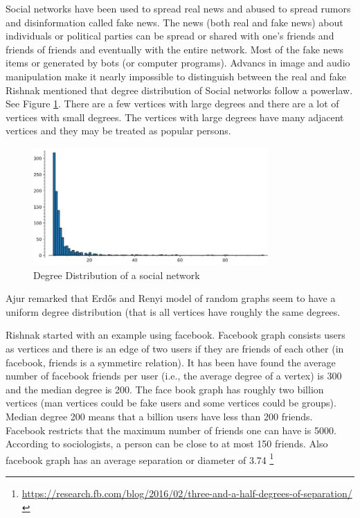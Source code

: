  Social networks have been used to spread real news and abused to spread rumors and disinformation called fake news. The news (both real and fake news) about individuals or political parties can be spread or shared with
 one's friends and friends of friends and eventually with the entire network. Most of the fake news items or  generated by bots (or computer programs). Advancs in image and audio manipulation make it nearly impossible to distinguish between the real and fake 
 Rishnak mentioned that degree distribution of Social networks follow a powerlaw. See Figure \ref{21p1}.  There are a few vertices with large degrees and there are a lot of vertices with small degrees.  The vertices with large degrees have many adjacent vertices and they may be treated as popular persons.
 \begin{figure}
 \begin{center}
\includegraphics[width=0.8\textwidth]{degreepowerlawdist.jpg}
\caption{Degree Distribution of a social network}\label{21p1}
\end{center}

\end{figure}
\begin{newpage}
\end{newpage}
 
 Ajur remarked that Erd\H{o}s and Renyi model of random graphs seem to have a uniform degree distribution (that is all vertices have roughly the same degrees.
 
 Rishnak started with an example using facebook. Facebook graph consists users as vertices and there is an edge of two users if they are friends of each other (in facebook, friends is a symmetirc relation). It has been
 have found the average number of facebook friends per user (i.e., the average degree of a vertex) is 300 and the median degree is 200. The face book graph has roughly two billion vertices (man vertices could be fake users and some vertices could be groups). Median degree 200 means that a billion users have less than 200 friends. Facebook restricts that the maximum number of friends one can have is 5000. According to sociologists, a person can be close to at most 150 friends. Also facebook graph has an average separation or diameter of 3.74 \footnote{\url{https://research.fb.com/blog/2016/02/three-and-a-half-degrees-of-separation/}}
 
